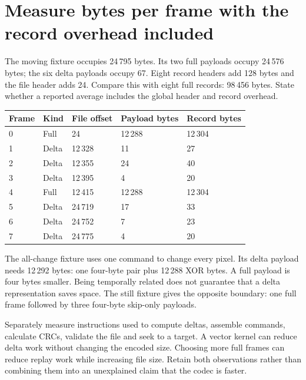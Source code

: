 \section{Measure bytes per frame with the record overhead included}
The moving fixture occupies 24\,795 bytes. Its two full payloads occupy 24\,576 bytes;
the six delta payloads occupy 67. Eight record headers add 128 bytes and the file
header adds 24. Compare this with eight full records: 98\,456 bytes. State whether a
reported average includes the global header and record overhead.
\begin{longtable}{p{13mm}p{24mm}p{23mm}p{30mm}p{30mm}}
  \toprule Frame & Kind  & File offset & Payload bytes & Record bytes \\\midrule
  0              & Full  & 24          & 12\,288       & 12\,304      \\
  1              & Delta & 12\,328     & 11            & 27           \\
  2              & Delta & 12\,355     & 24            & 40           \\
  3              & Delta & 12\,395     & 4             & 20           \\
  4              & Full  & 12\,415     & 12\,288       & 12\,304      \\
  5              & Delta & 24\,719     & 17            & 33           \\
  6              & Delta & 24\,752     & 7             & 23           \\
  7              & Delta & 24\,775     & 4             & 20           \\\bottomrule
\end{longtable}
The all-change fixture uses one command to change every pixel. Its delta payload
needs 12\,292 bytes: one four-byte pair plus 12\,288 XOR bytes. A full payload is four
bytes smaller. Being temporally related does not guarantee that a delta representation
saves space. The still fixture gives the opposite boundary: one full frame followed
by three four-byte skip-only payloads.

Separately measure instructions used to compute deltas, assemble commands, calculate
CRCs, validate the file and seek to a target. A vector kernel can reduce delta work
without changing the encoded size. Choosing more full frames can reduce replay work
while increasing file size. Retain both observations rather than combining them into
an unexplained claim that the codec is faster.
